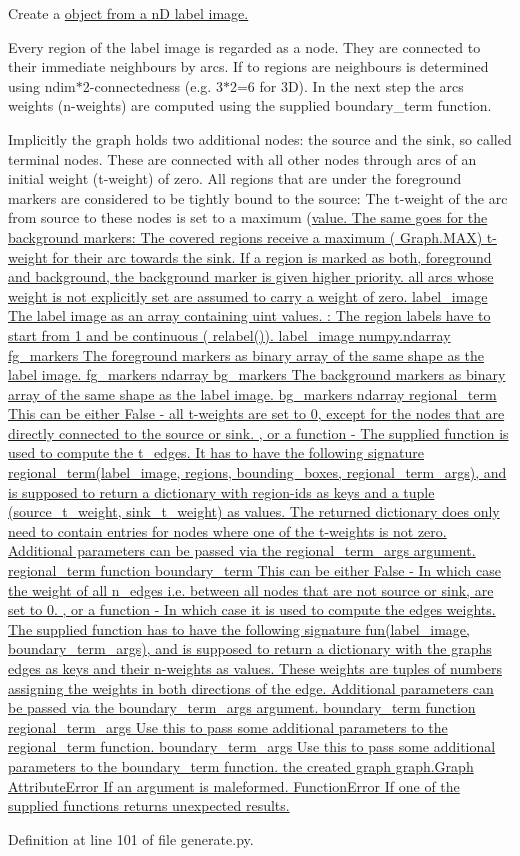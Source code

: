 Create a \hyperlink{}{object from a nD label image. }

Every region of the label image is regarded as a node. They are connected to their immediate neighbours by arcs. If to regions are neighbours is determined using ndim$\ast$2-\/connectedness (e.g. 3$\ast$2=6 for 3D). In the next step the arcs weights (n-\/weights) are computed using the supplied boundary\_\-term function.

Implicitly the graph holds two additional nodes: the source and the sink, so called terminal nodes. These are connected with all other nodes through arcs of an initial weight (t-\/weight) of zero. All regions that are under the foreground markers are considered to be tightly bound to the source: The t-\/weight of the arc from source to these nodes is set to a maximum (\hyperlink{}{value. The same goes for the background markers: The covered regions receive a maximum ( Graph.MAX) t-\/weight for their arc towards the sink.   If a region is marked as both, foreground and background, the background marker is given higher priority.   all arcs whose weight is not explicitly set are assumed to carry a weight of zero.   label\_\-image The label image as an array containing uint values. : The region labels have to start from 1 and be continuous ( relabel()).  label\_\-image numpy.ndarray  fg\_\-markers The foreground markers as binary array of the same shape as the label image.  fg\_\-markers ndarray  bg\_\-markers The background markers as binary array of the same shape as the label image.  bg\_\-markers ndarray  regional\_\-term This can be either False -\/ all t-\/weights are set to 0, except for the nodes that are directly connected to the source or sink. , or a function -\/ The supplied function is used to compute the t\_\-edges. It has to have the following signature regional\_\-term(label\_\-image, regions, bounding\_\-boxes, regional\_\-term\_\-args), and is supposed to return a dictionary with region-\/ids as keys and a tuple (source\_\-t\_\-weight, sink\_\-t\_\-weight) as values. The returned dictionary does only need to contain entries for nodes where one of the t-\/weights is not zero. Additional parameters can be passed via the regional\_\-term\_\-args argument.  regional\_\-term function  boundary\_\-term This can be either False -\/ In which case the weight of all n\_\-edges i.e. between all nodes that are not source or sink, are set to 0. , or a function -\/ In which case it is used to compute the edges weights. The supplied function has to have the following signature fun(label\_\-image, boundary\_\-term\_\-args), and is supposed to return a dictionary with the graphs edges as keys and their n-\/weights as values. These weights are tuples of numbers assigning the weights in both directions of the edge. Additional parameters can be passed via the boundary\_\-term\_\-args argument.  boundary\_\-term function  regional\_\-term\_\-args Use this to pass some additional parameters to the regional\_\-term function.  boundary\_\-term\_\-args Use this to pass some additional parameters to the boundary\_\-term function.   the created graph  graph.Graph   AttributeError If an argument is maleformed.  FunctionError If one of the supplied functions returns unexpected results. }

Definition at line 101 of file generate.py.

